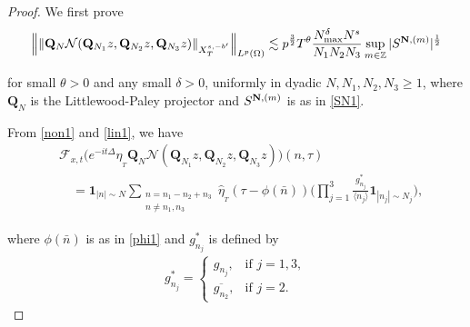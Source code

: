 \documentclass[%
11pt,  reqno]{amsart}
\newcommand{\1}{\hspace{0.2mm}\text{I}\hspace{0.2mm}}
\newcommand{\noi}{\noindent}
\newcommand{\Z}{\mathbb{Z}}
\newcommand{\Q}{\mathbf{Q}}
\newcommand{\F}{\mathcal{F}}
\newcommand{\dl}{\delta}
\newcommand{\ft}{\widehat}
\newcommand{\cj}{\overline}
\newcommand{\ta}{\theta}
\renewcommand{\O}{\Omega}
\newcommand{\les}{\lesssim}
\newcommand{\jb}[1]
{\langle #1 \rangle}
\newcommand{\ind}{\mathbf 1}
\newcommand{\NN}{\mathcal{N}}
\numberwithin{equation}{section}
\numberwithin{theorem}{section}
\begin{document}
\begin{proof} %


We first prove 
\begin{align}
\label{PS4}
\begin{split}
\Big\|\| \Q_{N} 
\NN(\Q_{N_1} z, \Q_{N_2} z, \Q_{N_3} z) \|_{X^{s,-b'}_T}\Big\|_{L^p(\O)}
 \les p^\frac 32 T^\ta \frac{N_{\max}^{ \dl} N^{s}} {N_1N_2N_3}
\sup_{m \in \Z} |S^{{\bf N}, (m)}|^\frac 12 
\end{split}
\end{align}

\noi 
for small $\ta> 0$ and any small $ \dl > 0$, uniformly in dyadic $N, N_1, N_2, N_3 \ge 1$, 
where $\Q_N$ is the Littlewood-Paley
 projector
and 
$S^{{\bf N}, (m)}$ is as in \eqref{SN1}.





From \eqref{non1}
and \eqref{lin1}, we have 
\begin{align*}
&  \F_{x, t}\big(e^{-it \Delta}  
\eta_{_T}
\Q_N 
\NN(\Q_{N_1} z, \Q_{N_2} z, \Q_{N_3} z) \big)(n, \tau)\\
& \quad = 
\ind_{|n|\sim N}
\sum_{\substack{n = n_1 - n_2 + n_3\\ n \neq n_1, n_3}} 
\ft \eta_{_T} (\tau - \phi (\bar n))
\bigg( \prod_{j=1}^3 \frac{g_{n_j}^*}{\jb{n_j}}\ind_{|n_j|\sim N_j}  \bigg), 
\end{align*}

\noi 
where $\phi(\bar n)$ is as in \eqref{phi1}
and $g^*_{n_j}$ is defined by 
\begin{align}
g^*_{n_j} = 
\begin{cases}
g_{n_j}, & \text{if } j = 1, 3,\\
\cj{g_{n_2}}, & \text{if } j = 2.
\end{cases}
\label{g1}
\end{align}





%
%
%


\end{proof}
\end{document}
